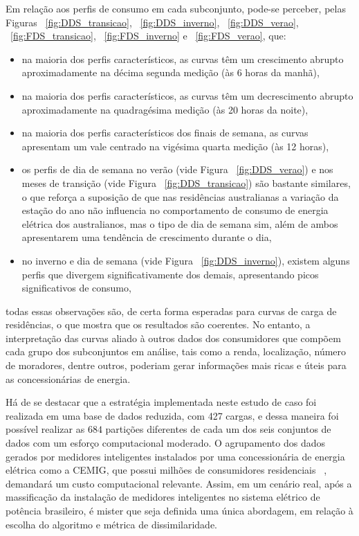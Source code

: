 Em relação aos perfis de consumo em cada subconjunto, pode-se perceber, pelas Figuras  ~\ref{fig:DDS_transicao},  ~\ref{fig:DDS_inverno}, ~\ref{fig:DDS_verao}, ~\ref{fig:FDS_transicao}, ~\ref{fig:FDS_inverno} e ~\ref{fig:FDS_verao}, que:
\begin{itemize}
	\item na maioria dos perfis característicos, as curvas têm um crescimento abrupto aproximadamente na décima segunda medição (às 6 horas da manhã),
	\item na maioria dos perfis característicos, as curvas têm um decrescimento abrupto aproximadamente na quadragésima medição (às 20 horas da noite),
	\item na maioria dos perfis característicos dos finais de semana, as curvas apresentam um vale centrado na vigésima quarta medição (às 12 horas),
	\item os perfis de dia de semana no verão (vide Figura ~\ref{fig:DDS_verao}) e nos meses de transição (vide Figura ~\ref{fig:DDS_transicao}) são bastante similares, o que reforça a suposição de que nas residências australianas a variação da estação do ano não influencia no comportamento de consumo de energia elétrica dos australianos, mas o tipo de dia de semana sim, além de ambos apresentarem uma tendência de crescimento durante o dia,
	\item no inverno e dia de semana (vide Figura ~\ref{fig:DDS_inverno}), existem alguns perfis que divergem significativamente dos demais, apresentando picos significativos de consumo,
\end{itemize}
todas essas observações são, de certa forma esperadas para curvas de carga de residências, o que mostra que os resultados são coerentes. No entanto, a interpretação das curvas aliado à outros dados dos consumidores que compõem cada grupo dos subconjuntos em análise, tais como a renda, localização, número de moradores, dentre outros, poderiam gerar informações mais ricas e úteis para as concessionárias de energia.

Há de se destacar que a estratégia implementada neste estudo de caso foi realizada em uma base de dados reduzida, com 427 cargas, e dessa maneira foi possível realizar as $684$ partições diferentes de cada um dos seis conjuntos de dados com um esforço computacional moderado. O agrupamento dos dados gerados por medidores inteligentes instalados por uma concessionária de energia elétrica como a CEMIG, que possui milhões de consumidores residenciais ~\parencite{DadosCemig}, demandará um custo computacional relevante. Assim, em um cenário real, após a massificação da instalação de medidores inteligentes no sistema elétrico de potência brasileiro, é mister que seja definida uma única abordagem, em relação à escolha do algoritmo e métrica de dissimilaridade.

